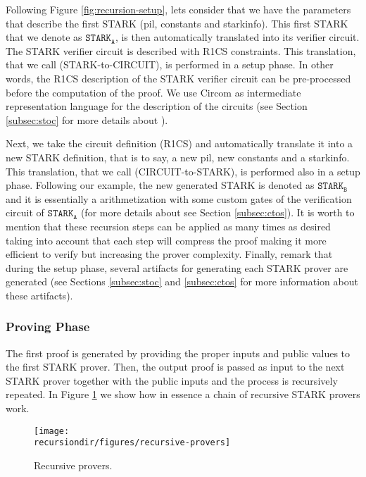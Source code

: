 Following Figure \ref{fig:recursion-setup}, lets consider that 
we have the parameters that describe the first STARK (pil, constants and starkinfo).
This first STARK that we denote as $\texttt{STARK}_{\texttt{A}}$, is then automatically translated into its verifier circuit. 
The STARK verifier circuit is described with R1CS constraints.
This translation, that we call \stoc (STARK-to-CIRCUIT), is performed in a setup phase. In other words, the R1CS description of the STARK verifier circuit can be pre-processed before the computation of the proof. 
We use Circom as intermediate representation language for the description of the circuits (see Section \ref{subsec:stoc} for more details about \stoc).

Next, we take the circuit definition (R1CS) and automatically translate it into a new STARK definition, that is to say, a new pil, new constants and a starkinfo.
This translation, that we call \ctos (CIRCUIT-to-STARK), 
is performed also in a setup phase.
Following our example, the new generated STARK is denoted as
$\texttt{STARK}_{\texttt{B}}$ and it is essentially a  arithmetization with some custom gates of the verification circuit of $\texttt{STARK}_{\texttt{A}}$
(for more details about \stoc see Section \ref{subsec:ctos}).
It is worth to mention that these recursion steps can be applied as many times as desired taking into account that each step will compress the proof making it
more efficient to verify but increasing the prover complexity.
Finally, remark that during the setup phase, several artifacts for generating each STARK prover are generated (see Sections \ref{subsec:stoc} and \ref{subsec:ctos} for more information 
about these artifacts). 

\subsubsection{Proving Phase \label{subsubsec:proving:phase:intro}}


The first proof is generated by providing the proper inputs and public values to the first STARK prover. Then, the output proof is passed as input to the next STARK prover together with the public inputs and the process is recursively repeated.
In Figure \ref{fig:recursive-provers} we show how in essence a chain of recursive STARK provers work.

\begin{figure}[H]
\centering
\texttt{[image: \\recursiondir/figures/recursive-provers]}
\caption{Recursive provers.}
\label{fig:recursive-provers}
\end{figure}

